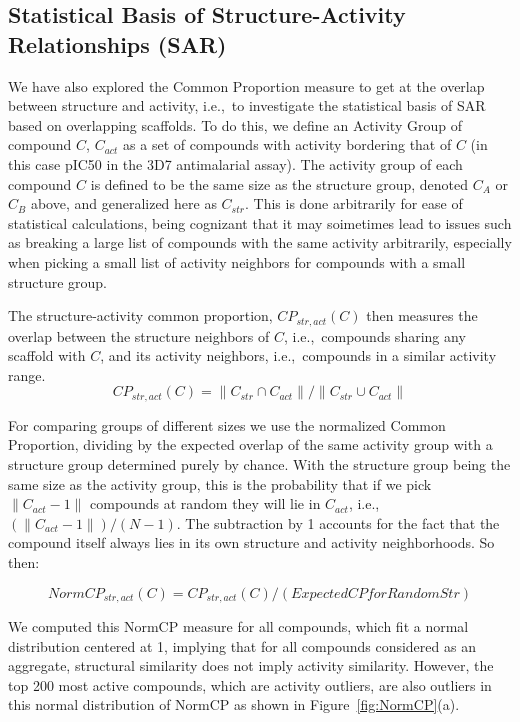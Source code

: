 \documentclass[journal=jacsat,manuscript=article]{achemso}
\newcommand*\fref[1]{Figure~\ref{fig:#1}}
\newcommand*\ie{i.e.,~}
\begin{document}
\subsection{Statistical Basis of Structure-Activity Relationships (SAR)}\label{sec:statSAR}

We have also explored the Common Proportion measure to get at the overlap between structure and activity, \ie to investigate the statistical basis of SAR based on overlapping scaffolds. To do this, we define an Activity Group of compound $C$, $C_{act}$ as a set of compounds with activity bordering that of $C$ (in this case pIC50 in the 3D7 antimalarial assay). The activity group of each compound $C$ is defined to be the same size as the structure group, denoted $C_A$ or $C_B$ above, and generalized here as $C_{str}$.  This is done arbitrarily for ease of statistical calculations, being cognizant that it may soimetimes lead to issues such as breaking a large list of compounds with the same activity arbitrarily, especially when picking a small list of activity neighbors for compounds with a small structure group.

The structure-activity common proportion, $CP_{str,act}(C)$ then measures the overlap between the structure neighbors of $C$, \ie compounds sharing any scaffold with $C$, and its activity neighbors, \ie compounds in a similar activity range.
\begin{equation}
CP_{str,act}(C) = \| C_{str} \cap C_{act} \| / \| C_{str} \cup C_{act} \|
\end{equation}

For comparing groups of different sizes we use the normalized Common Proportion, dividing by the expected overlap of the same activity group with a structure group determined purely by chance.  With the structure group being the same size as the activity group, this is the probability that if we pick $ \| C_{act} - 1\|$ compounds at random they will lie in $C_{act}$, \ie $(\| C_{act} - 1\|)/(N - 1)$. The subtraction by 1 accounts for the fact that the compound itself always lies in its own structure and activity neighborhoods. So then:

\begin{equation}
NormCP_{str,act}(C) = CP_{str,act}(C) / (Expected CP for Random Str) 
\end{equation}

We computed this NormCP measure for all compounds, which fit a normal distribution centered at 1, implying that for all compounds considered as an aggregate, structural similarity does not imply activity similarity.  However, the top 200 most active compounds, which are activity outliers, are also outliers in this normal distribution of NormCP as shown in \fref{NormCP}(a).
\end{document}
